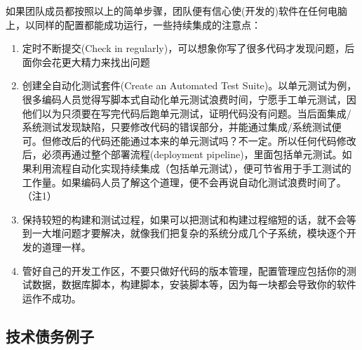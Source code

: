 如果团队成员都按照以上的简单步骤，团队便有信心使(开发的)软件在任何电脑上，以同样的配置都能成功运行，一些持续集成的注意点：

\begin{enumerate}
\tightlist
\item
  定时不断提交(Check in
  regularly)，可以想象你写了很多代码才发现问题，后面你会花更大精力来找出问题
\item
  创建全自动化测试套件(Create an Automated Test
  Suite)。以单元测试为例，很多编码人员觉得写脚本式自动化单元测试浪费时间，宁愿手工单元测试，因他们以为只须要在写完代码后跑单元测试，证明代码没有问题。当后面集成/系统测试发现缺陷，只要修改代码的错误部分，并能通过集成/系统测试便可。但修改后的代码还能通过本来的单元测试吗？不一定。所以任何代码修改后，必须再通过整个部署流程(deployment
  pipeline)，里面包括单元测试。如果利用流程自动化实现持续集成（包括单元测试），便可节省用于手工测试的工作量。如果编码人员了解这个道理，便不会再说自动化测试浪费时间了。（注1）
\item
  保持较短的构建和测试过程，如果可以把测试和构建过程缩短的话，就不会等到一大堆问题才要解决，就像我们把复杂的系统分成几个子系统，模块逐个开发的道理一样。
\item
  管好自己的开发工作区，不要只做好代码的版本管理，配置管理应包括你的测试数据，数据库脚本，构建脚本，安装脚本等，因为每一块都会导致你的软件运作不成功。
\end{enumerate}

\begin{description}
\item[]
\end{description}

\hypertarget{ux6280ux672fux503aux52a1ux4f8bux5b50}{%
\subsection{技术债务例子}\label{ux6280ux672fux503aux52a1ux4f8bux5b50}}


